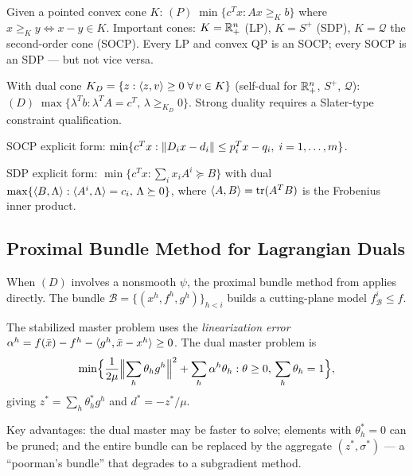 \begin{defn}\label{def:conic}
	Given a pointed convex cone $K$:
	$(P)\; \min\{c^T x : Ax \geq_K b\}$ where $x \geq_K y \Leftrightarrow x - y \in K$.
	Important cones: $K = \mathbb{R}_+^n$ (LP), $K = S^+$ (SDP), $K = \mathcal{Q}$ the second-order cone (SOCP).
	Every LP and convex QP is an SOCP; every SOCP is an SDP --- but not vice versa.
\end{defn}

\begin{defn}\label{def:conic-dual}
	With dual cone $K_D = \{z : \langle z, v\rangle \geq 0\;\forall\, v \in K\}$ (self-dual for $\mathbb{R}_+^n$, $S^+$, $\mathcal{Q}$):
	$(D)\; \max\{\lambda^T b : \lambda^T A = c^T,\, \lambda \geq_{K_D} 0\}$.
	Strong duality requires a Slater-type constraint qualification.
\end{defn}

SOCP explicit form: $\min\{c^T x : \lVert D_i x - d_i\rVert \leq p_i^T x - q_i,\; i = 1, \dots, m\}$.

SDP explicit form: $\min\{c^T x : \sum_i x_i A^i \succeq B\}$ with dual $\max\{\langle B, \Lambda\rangle : \langle A^i, \Lambda\rangle = c_i,\, \Lambda \succeq 0\}$, where $\langle A, B\rangle = \operatorname{tr}(A^T B)$ is the Frobenius inner product.


\subsection{Proximal Bundle Method for Lagrangian Duals}\label{ssec:bundle-dual}

When $(D)$ involves a nonsmooth $\psi$, the proximal bundle method from  applies directly.
The bundle $\mathcal{B} = \{(x^h, f^h, g^h)\}_{h < i}$ builds a cutting-plane model $f_{\mathcal{B}}^i \leq f$.

The stabilized master problem uses the \textit{linearization error} $\alpha^h = f(\bar{x}) - f^h - \langle g^h, \bar{x} - x^h\rangle \geq 0$.
The dual master problem is
\begin{equation}\label{eq:dual-master}
	\min\Bigl\{\frac{1}{2\mu}\Bigl\|\sum_{h} \theta_h g^h\Bigr\|^2 + \sum_h \alpha^h \theta_h : \theta \geq 0,\, \sum_h \theta_h = 1\Bigr\},
\end{equation}
giving $z^* = \sum_h \theta_h^* g^h$ and $d^* = -z^*/\mu$.

Key advantages: the dual master may be faster to solve; elements with $\theta_h^* = 0$ can be pruned; and the entire bundle can be replaced by the aggregate $(z^*, \sigma^*)$ --- a ``poorman's bundle'' that degrades to a subgradient method.



